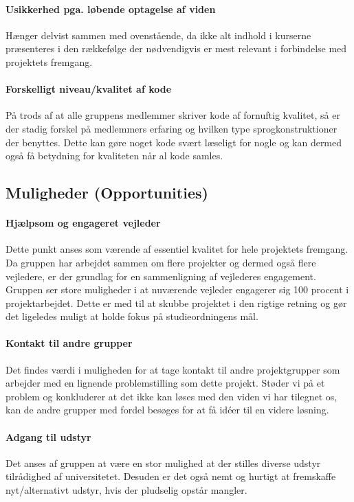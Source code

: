 \paragraph{Usikkerhed pga. løbende optagelse af viden}\label{swot:optagelse_af_viden}
Hænger delvist sammen med ovenstående, da ikke alt indhold i kurserne præsenteres i den rækkefølge der nødvendigvis er mest relevant i forbindelse med projektets fremgang.

\paragraph{Forskelligt niveau/kvalitet af kode}\label{swot:niveau_af_kode}
På trods af at alle gruppens medlemmer skriver kode af fornuftig kvalitet, så er der stadig forskel på medlemmers erfaring og hvilken type sprogkonstruktioner der benyttes.
Dette kan gøre noget kode svært læseligt for nogle og kan dermed også få betydning for kvaliteten når al kode samles.

\subsection{Muligheder \textnormal{(\textbf{O}pportunities)}}

\paragraph{Hjælpsom og engageret vejleder}
Dette punkt anses som værende af essentiel kvalitet for hele projektets fremgang. 
Da gruppen har arbejdet sammen om flere projekter og dermed også flere vejledere, er der grundlag for en sammenligning af vejlederes engagement.
Gruppen ser store muligheder i at nuværende vejleder engagerer sig 100 procent i projektarbejdet.
Dette er med til at skubbe projektet i den rigtige retning og gør det ligeledes muligt at holde fokus på studieordningens mål.

\paragraph{Kontakt til andre grupper}
Det findes værdi i muligheden for at tage kontakt til andre projektgrupper som arbejder med en lignende problemstilling som dette projekt.
Støder vi på et problem og konkluderer at det ikke kan løses med den viden vi har tilegnet os, kan de andre grupper med fordel besøges for at få idéer til en videre løsning.

\paragraph{Adgang til udstyr}
Det anses af gruppen at være en stor mulighed at der stilles diverse udstyr tilrådighed af universitetet.
Desuden er det også nemt og hurtigt at fremskaffe nyt/alternativt udstyr, hvis der pludselig opstår mangler.

